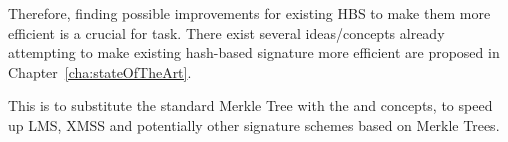 Therefore, finding possible improvements for existing HBS to make them more efficient is a crucial for task. %
There exist several ideas/concepts already attempting to make existing hash-based signature more efficient are proposed in Chapter~\ref{cha:stateOfTheArt}.

This is to substitute the standard Merkle Tree with the \tftree and \extree concepts, to speed up LMS, XMSS and potentially other signature schemes based on Merkle Trees.


